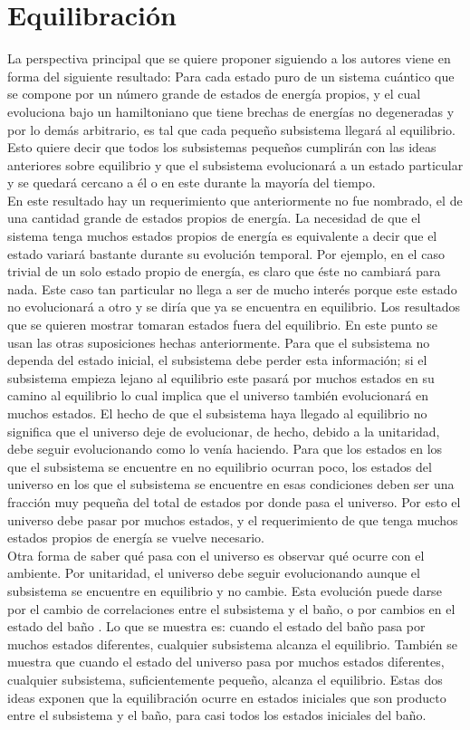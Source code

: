 \section{Equilibración}

La perspectiva principal que se quiere proponer siguiendo a  los autores \cite{LindenPaper} viene en forma del siguiente resultado: Para cada estado puro de un sistema cuántico que se compone por un número grande de estados de energía propios, y el cual evoluciona bajo un hamiltoniano que tiene brechas de energías no degeneradas y por lo demás arbitrario, es tal que cada pequeño subsistema llegará al equilibrio. Esto quiere decir que todos los subsistemas pequeños cumplirán con las ideas anteriores sobre equilibrio y que el subsistema evolucionará a un estado particular y se quedará cercano a él o en este durante la mayoría del tiempo.
\\
En este resultado hay un requerimiento que anteriormente no fue nombrado, el de una cantidad grande de estados propios de energía. La necesidad de que el sistema tenga muchos estados propios de energía es equivalente a decir que el estado variará bastante durante su evolución temporal. Por ejemplo, en el caso trivial de un solo estado propio de energía, es claro que éste no cambiará para nada. Este caso tan particular no llega a ser de mucho interés porque este estado no evolucionará a otro y se diría que ya se encuentra en equilibrio. Los resultados que se quieren mostrar tomaran estados fuera del equilibrio. En este punto se usan las otras suposiciones hechas anteriormente. Para que el subsistema no dependa del estado inicial, el subsistema debe perder esta información; si el subsistema empieza lejano al equilibrio este pasará  por muchos estados en su camino al equilibrio lo cual implica que el universo también evolucionará en muchos estados. El hecho de que el subsistema haya llegado al equilibrio no significa que el universo deje de evolucionar, de hecho, debido a la unitaridad, debe seguir evolucionando como lo venía haciendo. Para que los estados en los que el subsistema se encuentre en no equilibrio ocurran poco, los estados del universo en los que el subsistema se encuentre en esas condiciones deben ser una fracción muy pequeña del total de estados por donde pasa el universo. Por esto el universo debe pasar por muchos estados, y el requerimiento de que tenga muchos estados propios de energía se vuelve necesario. 
\\
Otra forma de saber qué pasa con el universo es observar qué ocurre con el ambiente. Por unitaridad, el universo debe seguir evolucionando aunque el subsistema se encuentre en equilibrio y no cambie. Esta evolución puede darse por el cambio de correlaciones entre el subsistema y el baño, o por cambios en el estado del baño \cite{Decoherence}. Lo que se muestra es: cuando el estado del baño pasa por muchos estados diferentes, cualquier subsistema alcanza el equilibrio. También se muestra que cuando el estado del universo pasa por muchos estados diferentes, cualquier subsistema, suficientemente pequeño, alcanza el equilibrio. Estas dos ideas exponen que la equilibración ocurre en estados iniciales que son producto entre el subsistema y el baño, para casi todos los estados iniciales del baño.
\\
 
